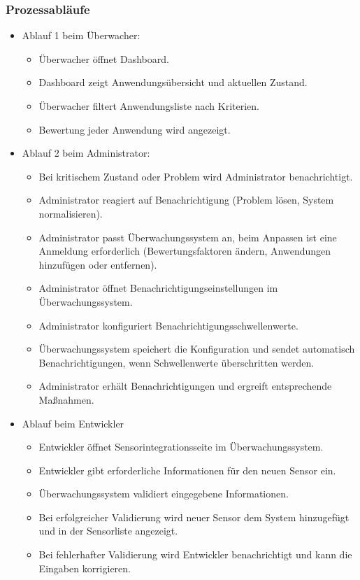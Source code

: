 \begin{flushleft}
\subsubsection{Prozessabläufe}
\begin{itemize}
	\item Ablauf 1 beim Überwacher:
	\begin{itemize}
		\item Überwacher öffnet Dashboard.
		\item Dashboard zeigt Anwendungsübersicht und aktuellen Zustand.
		\item Überwacher filtert Anwendungsliste nach Kriterien.
		\item Bewertung jeder Anwendung wird angezeigt.
	\end{itemize}
	\item Ablauf 2 beim Administrator:
	\begin{itemize}
		\item Bei kritischem Zustand oder Problem wird Administrator benachrichtigt.
		\item Administrator reagiert auf Benachrichtigung (Problem lösen, System normalisieren).
		\item Administrator passt Überwachungssystem an, beim Anpassen ist eine Anmeldung erforderlich (Bewertungsfaktoren ändern, Anwendungen hinzufügen oder entfernen).
		\item Administrator öffnet Benachrichtigungseinstellungen im Überwachungssystem.
		\item Administrator konfiguriert Benachrichtigungsschwellenwerte.
		\item Überwachungssystem speichert die Konfiguration und sendet automatisch Benachrichtigungen, wenn Schwellenwerte überschritten werden.
		\item Administrator erhält Benachrichtigungen und ergreift entsprechende Maßnahmen.
	\end{itemize}
		\item Ablauf beim Entwickler
	\begin{itemize}
		\item Entwickler öffnet Sensorintegrationsseite im Überwachungssystem.
		\item Entwickler gibt erforderliche Informationen für den neuen Sensor ein.
		\item Überwachungssystem validiert eingegebene Informationen.
		\item Bei erfolgreicher Validierung wird neuer Sensor dem System hinzugefügt und in der Sensorliste angezeigt.
		\item Bei fehlerhafter Validierung wird Entwickler benachrichtigt und kann die Eingaben korrigieren.
	\end{itemize}
\end{itemize}


\end{flushleft}
